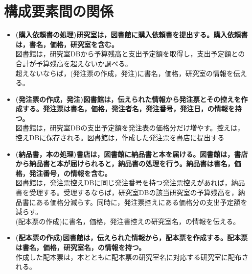 \documentclass[a4paper,10pt]{jsarticle}
\begin{document}
\section{構成要素間の関係}
\begin{itemize}
  \item \textbf{(購入依頼書の処理)研究室は，図書館に購入依頼書を提出する。購入依頼書は，書名，価格，研究室を含む。}\\図書館は，研究室DBから予算残高と支出予定額を取得し，支出予定額との合計が予算残高を超えないか調べる。\\超えないならば，(発注票の作成，発注)に書名，価格，研究室の情報を伝える。\\

  \item \textbf{(発注票の作成，発注)図書館は，伝えられた情報から発注票とその控えを作成する。発注票は書名，価格，発注者名，発注番号，発注日，の情報を持つ。}\\図書館は，研究室DBの支出予定額を発注表の価格分だけ増やす。控えは，控えDBに保存される。図書館は，作成した発注票を書店に提出する\\

  \item \textbf{(納品書，本の処理)書店は，図書館に納品書と本を届ける。図書館は，書店から納品書と本が届けられると，納品書の処理を行う。納品書は書名，価格，発注番号，の情報を含む。}\\図書館は，発注票控えDBに同じ発注番号を持つ発注票控えがあれば，納品書を受理する。受理するならば，研究室DBの該当研究室の予算残高を，納品書にある価格分減らす。同時に，発注票控えにある価格分の支出予定額を減らす。\\(配本票の作成)に書名，価格，発注書控えの研究室名，の情報を伝える。\\

  \item \textbf{(配本票の作成)図書館は，伝えられた情報から，配本票を作成する。配本票は書名，価格，研究室名，の情報を持つ。}\\作成した配本票は，本とともに配本票の研究室名に対応する研究室に配布される。
\end{itemize}
\end{document}
